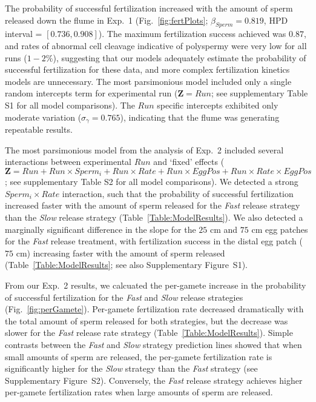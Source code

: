 \documentclass{article}
\begin{document}
	The probability of successful fertilization increased with the amount of sperm released down the flume in Exp.~1 (Fig.~\ref{fig:fertPlots}; $\beta_{Sperm} = 0.819$, HPD interval = $[0.736,0.908]$). The maximum fertilization success achieved was $0.87$, and rates of abnormal cell cleavage indicative of polyspermy were very low for all runs ($1-2\%$), suggesting that our models adequately estimate the probability of successful fertilization for these data, and more complex fertilization kinetics models are unnecessary. The most parsimonious model included only a single random intercepts term for experimental run ($\mathbf{Z} = Run$; see supplementary Table S1 for all model comparisons). The $Run$ specific intercepts exhibited only moderate variation ($\sigma_{\gamma} = 0.765$), indicating that the flume was generating repeatable results.

	The most parsimonious model from the analysis of Exp.~2 included several interactions between experimental $Run$ and `fixed' effects ($\mathbf{Z} = Run + Run \times Sperm_i + Run \times Rate + Run \times EggPos + Run \times Rate \times EggPos$; see supplementary Table S2 for all model comparisons). We detected a strong $Sperm_i \times Rate$ interaction, such that the probability of successful fertilization increased faster with the amount of sperm released for the \textit{Fast} release strategy than the \textit{Slow} release strategy (Table~\ref{Table:ModelResults}). We also detected a marginally significant difference in the slope for the $25$ cm and $75$ cm egg patches for the \textit{Fast} release treatment, with fertilization success in the distal egg patch ($75$ cm) increasing faster with the amount of sperm released (Table~\ref{Table:ModelResults}; see also Supplementary Figure~S1).

	From our Exp.~2 results, we calcuated the per-gamete increase in the probability of successful fertilization for the \textit{Fast} and \textit{Slow} release strategies (Fig.~\ref{fig:perGamete}). Per-gamete fertilization rate decreased dramatically with the total amount of sperm released for both strategies, but the decrease was slower for the \textit{Fast} release rate strategy (Table~\ref{Table:ModelResults}). Simple contrasts between the \textit{Fast} and \textit{Slow} strategy prediction lines showed that when small amounts of sperm are released, the per-gamete fertilization rate is significantly higher for the \textit{Slow} strategy than the \textit{Fast} strategy (see Supplementary Figure~S2). Conversely, the \textit{Fast} release strategy achieves higher per-gamete fertilization rates when large amounts of sperm are released.
\end{document}
